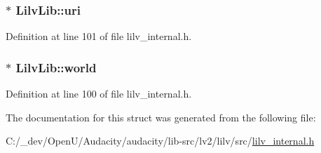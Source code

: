 \subsubsection[{\texorpdfstring{uri}{uri}}]{$\ast$ Lilv\+Lib\+::uri}\hypertarget{struct_lilv_lib_a491727e8f3a37f363df865b3747dca0f}{}\label{struct_lilv_lib_a491727e8f3a37f363df865b3747dca0f}


Definition at line 101 of file lilv\+\_\+internal.\+h.

\subsubsection[{\texorpdfstring{world}{world}}]{$\ast$ Lilv\+Lib\+::world}\hypertarget{struct_lilv_lib_a810957c6981e9beb5ed66e0384c55bf4}{}\label{struct_lilv_lib_a810957c6981e9beb5ed66e0384c55bf4}


Definition at line 100 of file lilv\+\_\+internal.\+h.



The documentation for this struct was generated from the following file\+:\begin{DoxyCompactItemize}
\item 
C\+:/\+\_\+dev/\+Open\+U/\+Audacity/audacity/lib-\/src/lv2/lilv/src/\hyperlink{lilv__internal_8h}{lilv\+\_\+internal.\+h}\end{DoxyCompactItemize}
